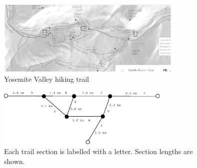 \documentclass[conference]{IEEEtran}
\begin{document}
\begin{figure}
\centering
\includegraphics[clip=true, viewport=0 280 625 525, width=3.5in]{yosemite.eps}
\caption{Yosemite Valley hiking trail  \label{fig:yosemite}}
\end{figure}

\begin{figure}
\centering
\includegraphics[width=3.25in]{yosemite_figure.eps}
\caption{Each trail section is labelled with a letter.  Section lengths are shown.  \label{fig:yosemite_figure}}
\end{figure}
\end{document}
